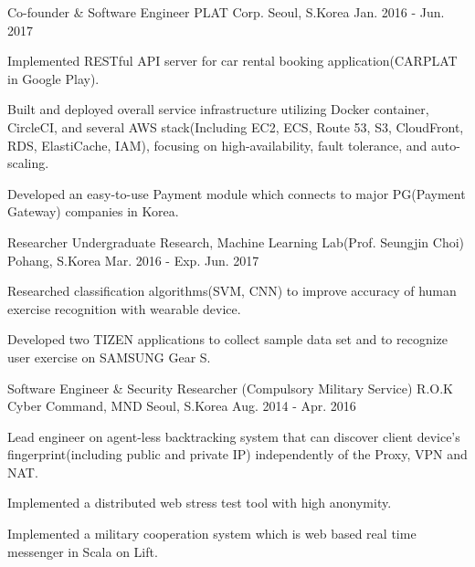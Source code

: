 \begin{cventries}
    \cventry
    {Co-founder \& Software Engineer} %
    {PLAT Corp.} %
    {Seoul, S.Korea} %
    {Jan. 2016 - Jun. 2017} %
    {
        \begin{cvitems} %
            \item {Implemented RESTful API server for car rental booking application(CARPLAT in Google Play).}
            \item {Built and deployed overall service infrastructure utilizing Docker container, CircleCI, and several AWS stack(Including EC2, ECS, Route 53, S3, CloudFront, RDS, ElastiCache, IAM), focusing on high-availability, fault tolerance, and auto-scaling.}
            \item {Developed an easy-to-use Payment module which connects to major PG(Payment Gateway) companies in Korea.}
        \end{cvitems}
    }

    \cventry
    {Researcher} %
    {Undergraduate Research, Machine Learning Lab(Prof. Seungjin Choi)} %
    {Pohang, S.Korea} %
    {Mar. 2016 - Exp. Jun. 2017} %
    {
        \begin{cvitems} %
            \item {Researched classification algorithms(SVM, CNN) to improve accuracy of human exercise recognition with wearable device.}
            \item {Developed two TIZEN applications to collect sample data set and to recognize user exercise on SAMSUNG Gear S.}
        \end{cvitems}
    }

    \cventry
    {Software Engineer \& Security Researcher (Compulsory Military Service)} %
    {R.O.K Cyber Command, MND} %
    {Seoul, S.Korea} %
    {Aug. 2014 - Apr. 2016} %
    {
        \begin{cvitems} %
            \item {Lead engineer on agent-less backtracking system that can discover client device's fingerprint(including public and private IP) independently of the Proxy, VPN and NAT.}
            \item {Implemented a distributed web stress test tool with high anonymity.}
            \item {Implemented a military cooperation system which is web based real time messenger in Scala on Lift.}
        \end{cvitems}
    }


\end{cventries}
